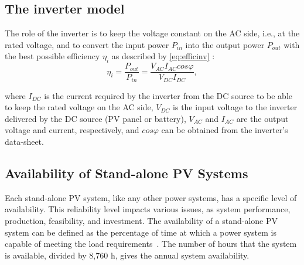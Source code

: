 \documentclass[review]{elsarticle}
\begin{document}
\subsection{The inverter model}
The role of the inverter is to keep the voltage constant on the AC side, i.e., at the rated voltage, %
and to convert the input power $ P_{in} $ into the output power $ P_{out} $ with the best possible efficiency $ \eta_{i} $ as described by \eqref{eq:efficinv} \cite{Hansen}:
%
\begin{equation}
\label{eq:efficinv}
\eta_{i} = \dfrac{P_{out}}{P_{in}} = \dfrac{V_{AC} I_{AC} cos\varphi}{V_{DC}I_{DC}},
\end{equation}

\noindent where $ I_{DC} $ is the current required by the inverter from the DC source to be able to keep the rated voltage on the AC side, $ V_{DC} $ is the input voltage to the inverter delivered by the DC source (PV panel or battery),  $ V_{AC}  $ and $ I_{AC} $ are the output voltage and current, respectively, and $ cos \varphi $ can be obtained from the inverter's data-sheet.

%
%
\subsection{Availability of Stand-alone PV Systems}
\label{sec:availability}
Each stand-alone PV system, like any other power systems, has a specific level of availability. This reliability level impacts various issues, as system performance, production, feasibility, and investment. The availability of a stand-alone PV system can be defined as the percentage of time at which a power system is capable of meeting the load requirements~\cite{Khatib2014}. The number of hours that the system is available, divided by 8,760 h, gives the annual system availability.
\end{document}
